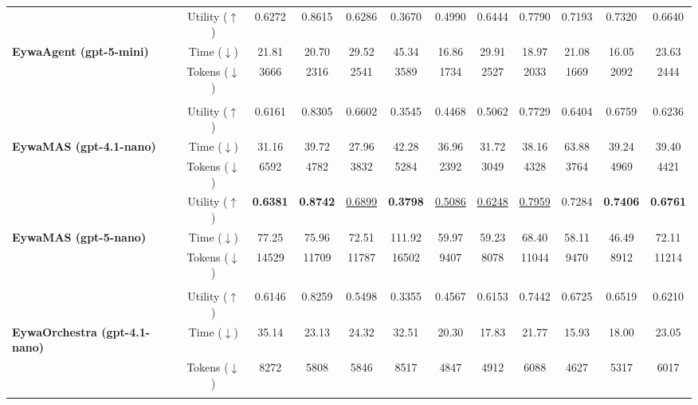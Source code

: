 \begin{table}[!t]
{\begin{tabular}{l|c|ccc|ccc|ccc|c}
        & Utility ($\uparrow$)   & 0.6272 & 0.8615 & 0.6286 & 0.3670 & 0.4990 & 0.6444 & 0.7790 & 0.7193 & 0.7320 & 0.6640\\
        \textbf{EywaAgent (gpt-5-mini)}
        & Time ($\downarrow$)  & 21.81 & 20.70 & 29.52 & 45.34 & 16.86 & 29.91 & 18.97 & 21.08 & 16.05 & 23.63\\
        & Tokens ($\downarrow$) & 3666 & 2316 & 2541 & 3589 & 1734 & 2527 & 2033 & 1669 & 2092 & 2444\\
        
        
        \addlinespace[-0.4ex] \midrule \addlinespace[-0.000ex]
        \multicolumn{12}{c}{
            \rule{0pt}{1.1em}
            \textbf{\textit{Multi-Agent Setting}}
            \rule[-0.3em]{0pt}{1.1em}
        } \\
        [-0.4ex]\midrule\addlinespace[-0.000ex]

        & Utility ($\uparrow$)   & 0.6161 & 0.8305 & 0.6602 & 0.3545 & 0.4468 & 0.5062 & 0.7729 & 0.6404 & 0.6759 & 0.6236\\
        \textbf{EywaMAS (gpt-4.1-nano)}
        & Time ($\downarrow$)  & 31.16 & 39.72 & 27.96 & 42.28 & 36.96 & 31.72 & 38.16 & 63.88 & 39.24 & 39.40\\
        & Tokens ($\downarrow$) & 6592 & 4782 & 3832 & 5284 & 2392 & 3049 & 4328 & 3764 & 4969 & 4421\\
        [-0.4ex]\midrule\addlinespace[-0.000ex]

        & Utility ($\uparrow$)   & \textbf{0.6381} & \textbf{0.8742} & \underline{0.6899} & \textbf{0.3798} & \underline{0.5086} & \underline{0.6248} & \underline{0.7959} & 0.7284 & \textbf{0.7406} & \textbf{0.6761}\\
        \textbf{EywaMAS (gpt-5-nano)}
        & Time ($\downarrow$)  & 77.25 & 75.96 & 72.51 & 111.92 & 59.97 & 59.23 & 68.40 & 58.11 & 46.49 & 72.11\\
        & Tokens ($\downarrow$) & 14529 & 11709 & 11787 & 16502 & 9407 & 8078 & 11044 & 9470 & 8912 & 11214\\
        
        \addlinespace[-0.4ex] \midrule \addlinespace[-0.000ex]
        \multicolumn{12}{c}{
            \rule{0pt}{1.1em}
            \textbf{\textit{Dynamic Orchestration}}
            \rule[-0.3em]{0pt}{1.1em}
        } \\
        [-0.4ex]\midrule\addlinespace[-0.000ex]

        & Utility ($\uparrow$)   & 0.6146 & 0.8259 & 0.5498 & 0.3355 & 0.4567 & 0.6153 & 0.7442 & 0.6725 & 0.6519 & 0.6210\\
        \textbf{EywaOrchestra (gpt-4.1-nano)}
        & Time ($\downarrow$)  & 35.14 & 23.13 & 24.32 & 32.51 & 20.30 & 17.83 & 21.77 & 15.93 & 18.00 & 23.05\\
        & Tokens ($\downarrow$) & 8272 & 5808 & 5846 & 8517 & 4847 & 4912 & 6088 & 4627 & 5317 & 6017\\
        [-0.4ex]\midrule\addlinespace[-0.000ex]


\end{tabular}}
\end{table}
